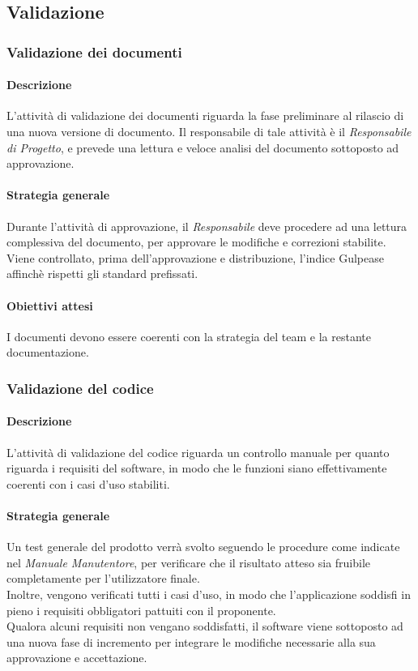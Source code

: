 	\subsection{Validazione}
	
	\subsubsection{Validazione dei documenti}
	
	\paragraph{Descrizione}
	L’attività di validazione dei documenti riguarda la fase preliminare al rilascio di una nuova versione di documento. Il responsabile di tale attività è il \textit{Responsabile di Progetto}, e prevede una lettura e veloce analisi del documento sottoposto ad approvazione. 
	
	\paragraph{Strategia generale}
	Durante l'attività di approvazione, il \textit{Responsabile} deve procedere ad una lettura complessiva del documento, per approvare le modifiche e correzioni stabilite.\\
	Viene controllato, prima dell'approvazione e distribuzione, l'indice Gulpease affinchè rispetti gli standard prefissati.

	\paragraph{Obiettivi attesi}
	I documenti devono essere coerenti con la strategia del team e la restante documentazione.	
	
	\subsubsection{Validazione del codice}
	
	\paragraph{Descrizione}
	L’attività di validazione del codice riguarda un controllo manuale per quanto riguarda i requisiti del software, in modo che le funzioni siano effettivamente coerenti con i casi d'uso stabiliti.
	
	\paragraph{Strategia generale}
	Un test generale del prodotto verrà svolto seguendo le procedure come indicate nel \textit{Manuale Manutentore}, per verificare che il risultato atteso sia fruibile completamente per l'utilizzatore finale.\\
	Inoltre, vengono verificati tutti i casi d'uso, in modo che l'applicazione soddisfi in pieno i requisiti obbligatori pattuiti con il proponente.\\
	Qualora alcuni requisiti non vengano soddisfatti, il software viene sottoposto ad una nuova fase di incremento per integrare le modifiche necessarie alla sua approvazione e accettazione.
	
